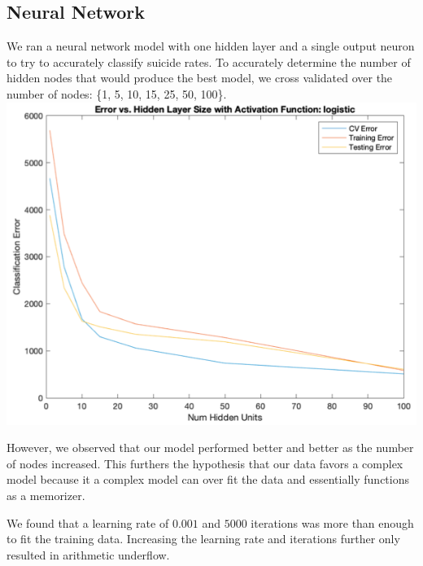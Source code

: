 \documentclass{article}
\begin{document}
\begin{multicols}{2}
\subsection{Neural Network} We ran a neural network model with one hidden layer and a single output neuron to try to accurately classify suicide rates. To accurately determine the number of hidden nodes that would produce the best model, we cross validated over the number of nodes: \{1, 5, 10, 15, 25, 50, 100\}. 
\begingroup
    \includegraphics[width=\columnwidth]{neur-net.png}
    \begin{spacing}{1.2}
    \label{fig:neural_net_fig} 
    \end{spacing}
\endgroup

However, we observed that our model performed better and better as the number of nodes increased. This furthers the hypothesis that our data favors a complex model because it a complex model can over fit the data and essentially functions as a memorizer. 

We found that a learning rate of $0.001$ and $5000$ iterations was more than enough to fit the training data. Increasing the learning rate and iterations further only resulted in arithmetic underflow. 



\end{multicols}
\end{document}
